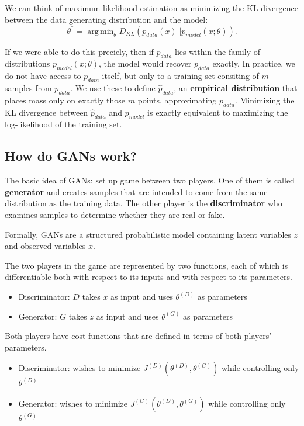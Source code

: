 \documentclass{scrartcl}
\DeclareMathOperator*{\argmin}{arg\,min}
\begin{document}
We can think of maximum likelihood estimation as minimizing the KL divergence between the data generating distribution and the model: $$\theta^* = \argmin_{\theta} D_{KL}(p_{data}(x)||p_{model}(x;\theta)).$$

If we were able to do this preciely, then if $p_{data}$ lies within the family of distributions $p_{model}(x; \theta)$, the model would recover $p_{data}$ exactly. In practice, we do not have access to $p_{data}$ itself, but only to a training set consiting of $m$ samples from $p_{data}$. We use these to define $\hat{p}_{data}$, an \textbf{empirical distribution} that places mass only on exactly those $m$ points, approximating $p_{data}$. Minimizing the KL divergence between $\hat{p}_{data}$ and $p_{model}$ is exactly equivalent to maximizing the log-likelihood of the training set.

\subsection{How do GANs work?}
The basic idea of GANs: set up game between two players. One of them is called \textbf{generator} and creates samples that are intended to come from the same distribution as the training data. The other player is the \textbf{discriminator} who examines samples to determine whether they are real or fake.

Formally, GANs are a structured probabilistic model containing latent variables $z$ and observed variables $x$. 


The two players in the game are represented by two functions, each of which is differentiable both with respect to its inputs and with respect to its parameters.
\begin{itemize}
	\item
		Discriminator: $D$ takes $x$ as input and uses $\theta^{(D)}$ as parameters
	\item
		Generator: $G$ takes $z$ as input and uses $\theta^{(G)}$ as parameters
\end{itemize}

Both players have cost functions that are defined in terms of both players’ parameters.
\begin{itemize}
	\item
		Discriminator: wishes to minimize $J^{(D)}(\theta^{(D)},\theta^{(G)})$ while controlling only $\theta^{(D)}$
	\item
		Generator: wishes to minimize $J^{(G)}(\theta^{(D)},\theta^{(G)})$ while controlling only $\theta^{(G)}$
\end{itemize}
\end{document}
